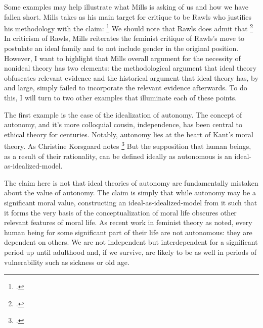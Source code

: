 \documentclass[letterpaper,notitlepage,12pt]{article}
\begin{document}
Some examples may help illustrate what Mills is asking of us and how we have
fallen short.
Mills takes as his main target for critique to be Rawls who justifies his
methodology with the claim: \footcite[p. 8]{
rawls_theory_1999}
We should note that Rawls does admit that \footcite[p.
8]{rawls_theory_1999}
In criticism of Rawls, Mills reiterates the feminist critique of Rawls's move to
postulate an ideal family and to not include gender in the original position.
However, I want to highlight that Mills overall argument for the necessity of
nonideal theory has two elements: the methodological argument that ideal theory
obfuscates relevant evidence and the historical argument that ideal theory has,
by and large, simply failed to incorporate the relevant evidence afterwards.
To do this, I will turn to two other examples that illuminate each of these
points.

The first example is the case of the idealization of autonomy.
The concept of autonomy, and it's more colloquial cousin, independence, has been
central to ethical theory for centuries.
Notably, autonomy lies at the heart of Kant's moral theory.
As Christine Korsgaard notes \footcite[p. 23]{korsgaard_creating_1996}
But the supposition that human beings, as a result of their rationality, can be
defined ideally as autonomous is an ideal-as-idealized-model.

The claim here is not that ideal theories of autonomy are fundamentally mistaken
about the value of autonomy.
The claim is simply that while autonomy may be a significant moral value,
constructing an ideal-as-idealized-model from it such that it forms the very
basis of the conceptualization of moral life obscures other relevant features of
moral life.
As recent work in feminist theory as noted, every human being for some
significant part of their life are not autonomous: they are dependent on others.
We are not independent but interdependent for a significant period up until
adulthood and, if we survive, are likely to be as well in periods of
vulnerability such as sickness or old age.
\end{document}
